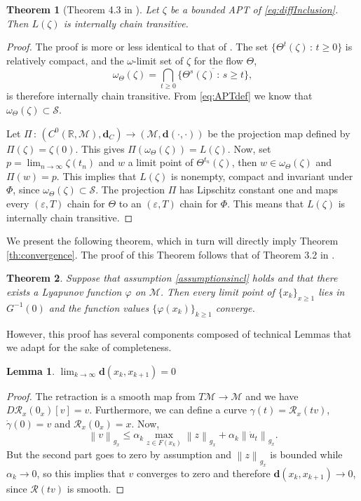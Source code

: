 \documentclass{article}
\newtheorem{lemma}{Lemma}
\newtheorem{theorem}{Theorem}
\newcommand{\CM}{\mathcal{M}}
\newcommand{\BR}{\mathbb{R}}
\newcommand{\bd}{\mathbf{d}}
\newcommand{\norm}[1]{\left\lVert#1\right\rVert}
\begin{document}
\begin{theorem}[Theorem 4.3 in \cite{benaim2005stochastic}]\label{th:ict}
    Let $\zeta$ be a bounded APT of \eqref{eq:diffInclusion}. Then $L(\zeta)$ is internally chain transitive. 
\end{theorem}


\begin{proof}
    The proof is more or less identical to that of \cite{benaim2005stochastic}. The set $\{\Theta^t(\zeta)\,:\,t\geq 0\}$ is relatively compact, and the $\omega$-limit set of $\zeta$ for the flow $\Theta$,
    \begin{equation}
        \omega_\Theta(\zeta)=\bigcap_{t\geq 0}\overline{\{\Theta^s(\zeta)\,:\,s\geq t\}},
    \end{equation}
    is therefore internally chain transitive. From \eqref{eq:APTdef} we know that $\omega_\Theta(\zeta)\subset \mathcal{S}$.

    Let $\Pi\,:\,(C^0(\BR,\CM),\bd_C)\to(\CM,\bd(\cdot,\cdot))$ be the projection map defined by $\Pi(\zeta)=\zeta(0)$. This gives $\Pi(\omega_\Theta(\zeta))=L(\zeta)$. Now, set $p=\lim_{n\to\infty}\zeta(t_n)$ and $w$ a limit point of $\Theta^{t_n}(\zeta)$, then $w\in \omega_\Theta(\zeta)$ and $\Pi(w)=p$. This implies that $L(\zeta)$ is nonempty, compact and invariant under $\Phi$, since $\omega_\Theta(\zeta)\subset \mathcal{S}$. The projection $\Pi$ has Lipschitz constant one and maps every $(\varepsilon,T)$ chain for $\Theta$ to an $(\varepsilon,T)$ chain for $\Phi$. This means that $L(\zeta)$ is internally chain transitive. 
\end{proof}


We present the following theorem, which in turn will directly imply Theorem \ref{th:convergence}. The proof of this Theorem follows that of Theorem 3.2 in \cite{davis2020stochastic}.
\begin{theorem}\label{th:3.2}
    Suppose that assumption \ref{assumptionsincl} holds and that there exists a Lyapunov function $\varphi$ on $\CM$. Then every limit point of $\{x_k\}_{x\geq 1}$ lies in $G^{-1}(0)$ and the function values $\{\varphi(x_k)\}_{k\geq 1}$ converge.
\end{theorem}

However, this proof has several components composed of technical Lemmas that we adapt for the sake of completeness.  
\begin{lemma}
    $\lim_{k\to\infty}\bd(x_k,x_{k+1})=0$
\end{lemma}

\begin{proof}
    The retraction is a smooth map from $T\CM\to \CM$ and we have $D\mathcal{R}_x(0_x)[v]=v$. Furthermore, we can define a curve $\gamma(t)=\mathcal{R}_x(tv)$, $\dot\gamma(0)=v$ and $\mathcal{R}_x(0_x)=x$. Now, 
    \begin{equation}
        \norm{v}_{g_x}\leq \alpha_k\max_{z\in F(x_k)}\norm{z}_{g_x}+\alpha_k\norm{\dot u_t}_{g_x}.
    \end{equation}
    But the second part goes to zero by assumption and $\norm{z}_{g_x}$ is bounded while $\alpha_k\to 0$, so this implies that $v$ converges to zero and therefore $\bd(x_k,x_{k+1})\to 0$, since $\mathcal{R}(tv)$ is smooth. 
\end{proof}
\end{document}
